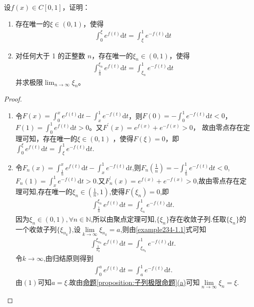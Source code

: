 \documentclass[../../main.tex]{subfiles}%
\begin{document}
\begin{example}
设$f(x)\in C[0,1]$，证明：
\begin{enumerate}[(1)]
\item 存在唯一的$\xi\in(0,1)$，使得
\begin{align*}
\int_{0}^{\xi}e^{f(t)}\mathrm{d}t=\int_{\xi}^{1}e^{-f(t)}\mathrm{d}t
\end{align*}

\item 对任何大于 1 的正整数 $n$，存在唯一的$\xi_n\in(0,1)$，使得
\begin{align*}
\int_{\frac{1}{n}}^{\xi_n}e^{f(t)}\mathrm{d}t=\int_{\xi_n}^{1}e^{-f(t)}\mathrm{d}t
\end{align*}
并求极限$\lim_{n \to \infty}\xi_n$。
\end{enumerate}
\end{example}
\begin{proof}
\begin{enumerate}[(1)]
\item 令$F(x) = \int_0^x e^{f(t)} \mathrm{d}t - \int_x^1 e^{-f(t)} \mathrm{d}t$，则$F(0) = -\int_0^1 e^{-f(t)} \mathrm{d}t < 0$，$F(1) = \int_0^1 e^{f(t)} \mathrm{d}t > 0$。又$F^\prime(x) = e^{f(x)} + e^{-f(x)} > 0$，
故由零点存在定理可知，存在唯一的$\xi \in (0,1)$ ，使得$F(\xi) = 0$，即$\int_0^{\xi} e^{f(t)} \mathrm{d}t = \int_{\xi}^1 e^{-f(t)} \mathrm{d}t$.

\item 令$F_n(x)=\int_{\frac{1}{n}}^x{e^{f(t)}\mathrm{d}t}-\int_x^1{e^{-f(t)}\mathrm{d}t}$,则$F_n\left(\frac{1}{n}\right)=-\int_{\frac{1}{n}}^1{e^{-f(t)}\mathrm{d}t}<0$,$F_n(1)=\int_x^1{e^{-f(t)}\mathrm{d}t}>0$.又$F_{n}^{\prime}(x)=e^{f(x)}+e^{-f(x)}>0$,故由零点存在定理可知,存在唯一的$\xi_n\in\left(\frac{1}{n},1\right)$,使得$F(\xi_n)=0$,即
\begin{align}
\int_{\frac{1}{n}}^{\xi_n}{e^{f(t)}\mathrm{d}t}=\int_{\xi_n}^1{e^{-f(t)}\mathrm{d}t}.\label{example234-1.1}
\end{align}
因为$\xi_n\in(0,1),\forall n\in\mathbb{N}$,所以由聚点定理可知,$\{\xi_n\}$存在收敛子列.任取$\{\xi_n\}$的一个收敛子列$\{\xi_{n_k}\}$,设$\underset{k\rightarrow\infty}{\lim}\xi_{n_k}=a$,则由\eqref{example234-1.1}式可知
\begin{align*}
\int_{\frac{1}{n_k}}^{\xi_{n_k}}{e^{f(t)}\mathrm{d}t}=\int_{\xi_{n_k}}^1{e^{-f(t)}\mathrm{d}t}.
\end{align*}
令$k\rightarrow\infty$,由归结原则得到
\begin{align*}
\int_0^a{e^{f(t)}\mathrm{d}t}=\int_a^1{e^{-f(t)}\mathrm{d}t}.
\end{align*}
由$(1)$可知$a=\xi$.故由\hyperref[proposition:子列极限命题]{命题\ref{proposition:子列极限命题}(a)}可知$\underset{n\rightarrow\infty}{\lim}\xi_n=\xi$.
\end{enumerate}
\end{proof}
\end{document}

